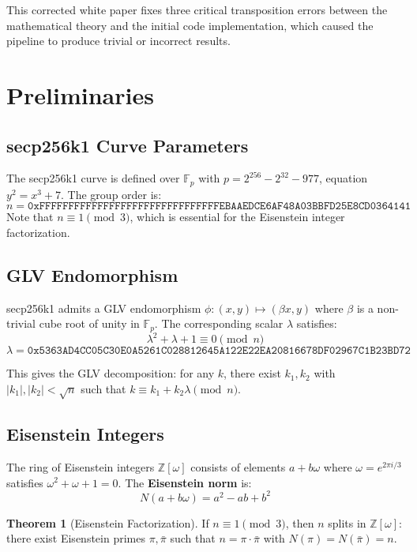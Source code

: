 \documentclass[11pt,a4paper]{article}
\theoremstyle{definition}
\newtheorem{theorem}{Theorem}[section]
\newcommand{\Zomega}{\mathbb{Z}[\omega]}
\newcommand{\sqn}{\sqrt{n}}
\begin{document}
This corrected white paper fixes three critical transposition errors between the mathematical theory and the initial code implementation, which caused the pipeline to produce trivial or incorrect results.

\section{Preliminaries}

\subsection{secp256k1 Curve Parameters}

The secp256k1 curve is defined over $\mathbb{F}_p$ with $p = 2^{256} - 2^{32} - 977$, equation $y^2 = x^3 + 7$. The group order is:
$$n = \texttt{0xFFFFFFFFFFFFFFFFFFFFFFFFFFFFFFFEBAAEDCE6AF48A03BBFD25E8CD0364141}$$
Note that $n \equiv 1 \pmod{3}$, which is essential for the Eisenstein integer factorization.

\subsection{GLV Endomorphism}

secp256k1 admits a GLV endomorphism $\phi: (x, y) \mapsto (\beta x, y)$ where $\beta$ is a non-trivial cube root of unity in $\mathbb{F}_p$. The corresponding scalar $\lambda$ satisfies:
$$\lambda^2 + \lambda + 1 \equiv 0 \pmod{n}$$
$$\lambda = \texttt{0x5363AD4CC05C30E0A5261C028812645A122E22EA20816678DF02967C1B23BD72}$$

This gives the GLV decomposition: for any $k$, there exist $k_1, k_2$ with $|k_1|, |k_2| < \sqn$ such that $k \equiv k_1 + k_2\lambda \pmod{n}$.

\subsection{Eisenstein Integers}

The ring of Eisenstein integers $\Zomega$ consists of elements $a + b\omega$ where $\omega = e^{2\pi i/3}$ satisfies $\omega^2 + \omega + 1 = 0$. The \textbf{Eisenstein norm} is:
\begin{equation}\label{eq:eisen-norm}
N(a + b\omega) = a^2 - ab + b^2
\end{equation}

\begin{theorem}[Eisenstein Factorization]
If $n \equiv 1 \pmod{3}$, then $n$ splits in $\Zomega$: there exist Eisenstein primes $\pi, \bar{\pi}$ such that $n = \pi \cdot \bar{\pi}$ with $N(\pi) = N(\bar{\pi}) = n$.
\end{theorem}
\end{document}
